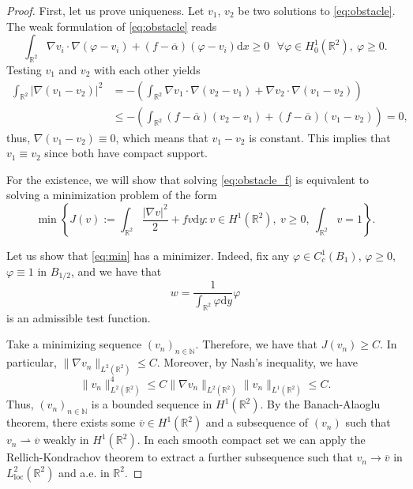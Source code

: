 \documentclass[10pt,a4paper]{article}
\newcommand{\loc}{\mathrm{loc}}
\newcommand{\NN}{\mathbb{N}}
\newcommand{\RR}{\mathbb{R}}
\newcommand{\faskip}{\hspace{8pt}}
\numberwithin{equation}{section}
\begin{document}
\begin{proof}
	First, let us prove uniqueness. Let $v_1$, $v_2$ be two solutions to \eqref{eq:obstacle}. The weak formulation of \eqref{eq:obstacle} reads	
\[
	\int_{\RR^{2}} \nabla v_i \cdot \nabla (\varphi - v_i) + (f - \overline{\alpha}) (\varphi - v_i) \mathrm{d}x \geq 0 \faskip \forall \varphi \in H_0^{1}(\RR^{2}), ~\varphi \geq 0.
\]
Testing $ v_1 $ and $ v_2 $ with each other yields
\begin{align*}
	\int_{\RR^{2}} |\nabla (v_1 - v_2)|^{2} &= -\left( \int_{\RR^{2}} \nabla v_1 \cdot \nabla (v_2 - v_1) + \nabla v_2 \cdot \nabla(v_1 - v_2) \right) \\
						&\leq - \left( \int_{\RR^{2}} (f - \overline{\alpha}) (v_2 - v_1) + (f - \overline{\alpha}) (v_1 - v_2) \right)  = 0,
\end{align*}
thus, $\nabla(v_1 - v_2) \equiv 0$, which means that $v_1 - v_2$ is constant. This implies that $v_1 \equiv v_2$ since both have compact support.

	For the existence, we will show that solving \eqref{eq:obstacle_f} is equivalent to solving a minimization problem of the form
\begin{equation}
\label{eq:min}
	\min \left\{ J(v) := \int_{\RR^{2}} \frac{|\nabla v|^{2}}{2} + f v \mathrm{d}y: v\in H^{1}(\RR^{2}),~ v\geq 0, ~ \int_{\RR^{2}}v = 1  \right\}.
\end{equation}

Let us show that \eqref{eq:min} has a minimizer. Indeed, fix any $ \varphi \in C^{1}_c(B_1) $, $ \varphi \geq 0 $, $ \varphi \equiv 1 $ in $ B_{1/2} $, and we have that
\[w = \frac{1}{\int_{\RR^{2}}\varphi \mathrm{d}y} \varphi\]
	is an admissible test function. 

	Take a minimizing sequence $ (v_n)_{n\in\NN} $. Therefore, we have that $ J(v_n) \geq C $. In particular, $ \|\nabla v_n \|_{L^{2} (\RR^{2})} \leq C $. Moreover, by Nash's inequality, we have
	\[\|v_n\|_{L^{2}(\RR^{2})}^{4} \leq C \|\nabla v_n \|_{L^{2}(\RR^{2})} \| v_n \|_{L^{1}(\RR^{2})} \leq C.\]
	Thus, $ (v_n)_{n\in \NN} $ is a bounded sequence in $ H^{1}(\RR^{2}) $. By the Banach-Alaoglu theorem, there exists some $ \overline{v} \in H^{1}(\RR^{2}) $ and a subsequence of $ (v_n) $ such that $ v_n \rightharpoonup \overline{v} $ weakly in $ H^{1} (\RR^2)$. In each smooth compact set we can apply the Rellich-Kondrachov theorem to extract a further subsequence such that $ v_n \rightarrow \overline{v} $ in $ L^{2}_{\loc}(\RR^{2}) $ and a.e. in $ \RR^{2} $.


\end{proof}
\end{document}
